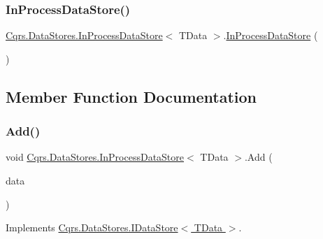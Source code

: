 \subsubsection{\texorpdfstring{In\+Process\+Data\+Store()}{InProcessDataStore()}}
{\footnotesize\ttfamily \hyperlink{classCqrs_1_1DataStores_1_1InProcessDataStore}{Cqrs.\+Data\+Stores.\+In\+Process\+Data\+Store}$<$ T\+Data $>$.\hyperlink{classCqrs_1_1DataStores_1_1InProcessDataStore}{In\+Process\+Data\+Store} (\begin{DoxyParamCaption}{ }\end{DoxyParamCaption})}



\subsection{Member Function Documentation}
\mbox{\label{classCqrs_1_1DataStores_1_1InProcessDataStore_ade5c4033c628598665c0cba986a54c15}} 
\subsubsection{\texorpdfstring{Add()}{Add()}\hspace{0.1cm}{\footnotesize\ttfamily [1/2]}}
{\footnotesize\ttfamily void \hyperlink{classCqrs_1_1DataStores_1_1InProcessDataStore}{Cqrs.\+Data\+Stores.\+In\+Process\+Data\+Store}$<$ T\+Data $>$.Add (\begin{DoxyParamCaption}\item[{T\+Data}]{data }\end{DoxyParamCaption})}



Implements \hyperlink{interfaceCqrs_1_1DataStores_1_1IDataStore_a114404daaf37fec9cc5547cd9a17858c}{Cqrs.\+Data\+Stores.\+I\+Data\+Store$<$ T\+Data $>$}.

\mbox{\label{classCqrs_1_1DataStores_1_1InProcessDataStore_ad62504e478f0a907c18ec4aa9b42703a}} 
